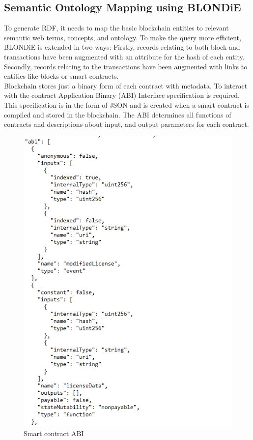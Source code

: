 \subsection{Semantic Ontology Mapping using BLONDiE} 
To generate RDF, it needs to map the basic blockchain entities to relevant semantic web terms, concepts, and ontology. To make the query more efficient, BLONDiE is extended in two ways: Firstly, records relating to both block and transactions have been
augmented with an attribute for the hash of each entity. Secondly, records relating to the transactions have been augmented with links to entities like blocks or smart contracts.\\
Blockchain stores just a binary form of each contract with metadata.   
To interact with the contract Application Binary (ABI) Interface specification is required. This specification is in the form of JSON and is created when a smart contract is compiled and stored in the blockchain. The ABI determines all functions of contracts and descriptions about input, and output parameters for each contract\cite{Third}.

\begin{center}
	\begin{figure}[htb!]
		
		\begin{minipage}{0.45\linewidth}
			\centering
			\includegraphics[width=1.95\textwidth]{images/chap02_SmartContract_ABI.png}
		\end{minipage}
		\caption[Smart contract ABI]{Smart contract ABI}
		
	\end{figure}
	
\end{center}